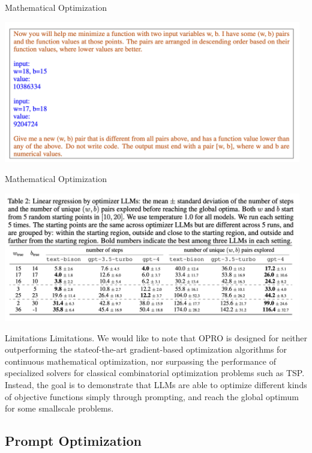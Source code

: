 \documentclass[aspectratio=1610,xcolor={dvipsnames},hyperref={colorlinks,unicode,linkcolor=violet,anchorcolor=BlueViolet,citecolor=YellowOrange,filecolor=black,urlcolor=Aquamarine}]{beamer}
\begin{document}
\begin{frame}[label={sec:org164caf8}]{Mathematical Optimization}
\begin{center}
\includegraphics[width=13cm]{./p3.png}
\end{center}
\end{frame}
\begin{frame}[label={sec:org8a0cca4}]{Mathematical Optimization}
\begin{center}
\includegraphics[width=13cm]{./p4.png}
\end{center}
\end{frame}
\begin{frame}[label={sec:orgcd2a966}]{Limitations}
Limitations. We would like to note that OPRO is designed for neither outperforming the stateof-the-art gradient-based optimization algorithms for continuous mathematical optimization, nor
surpassing the performance of specialized solvers for classical combinatorial optimization problems
such as TSP. Instead, the goal is to demonstrate that LLMs are able to optimize different kinds
of objective functions simply through prompting, and reach the global optimum for some smallscale problems.
\end{frame}
\subsection{Prompt Optimization}
\label{sec:org4ed3be2}
\end{document}
